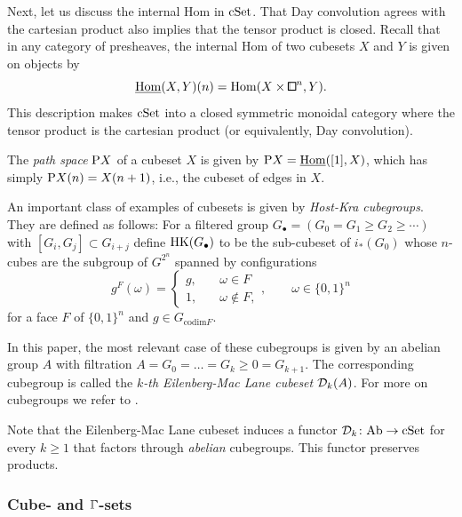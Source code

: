 Next, let us discuss the internal Hom in $\mathrm{cSet}$.
That Day convolution agrees with the cartesian product also implies that the tensor product is closed.
Recall that in any category of presheaves, the internal Hom of two cubesets $X$ and $Y$ is given on objects by
\[
    \ihom(X,Y)(n) = \hom(X\times{\bbox}^n,Y).
\]
This description makes $\mathrm{cSet}$ into a closed symmetric monoidal category where the tensor product
is the cartesian product (or equivalently, Day convolution).

\begin{example}
The \emph{path space} $\mathrm{P} X$ of a cubeset $X$ is given by $\mathrm{P} X = \underline{\operatorname{Hom}}([1],X)$,
which has simply $\mathrm{P} X(n) = X(n+1)$, i.e., the cubeset of edges in $X$.

\end{example}

\begin{example}\label{ex:host_kra_cubegroups}
An important class of examples of cubesets is given by \emph{Host-Kra cubegroups}.
They are defined as follows:
For a filtered group $G_\bullet=(G_0=G_1\ge G_2\ge \cdots)$ with $[G_i,G_j]\subset G_{i+j}$
define $\operatorname{HK}(G_\bullet)$ to be the sub-cubeset of $i_*(G_0)$
whose $n$-cubes are the subgroup of $G^{2^n}$ spanned by configurations
\[
    g^F(\omega)=\begin{cases}
        g,\quad & \omega\in F\\
        1,\quad & \omega \notin F,
    \end{cases},\qquad \omega\in \{0,1\}^n
\]
for a face $F$ of $\{0,1\}^n$ and $g\in G_{\mathrm{codim} F}$.

In this paper, the most relevant case of these cubegroups is given by an abelian group $A$
with filtration $A=G_0=\dots=G_k\ge 0=G_{k+1}$.
The corresponding cubegroup is called the \emph{$k$-th Eilenberg-Mac Lane cubeset $\mathcal{D}_k(A)$}.
For more on cubegroups we refer to \cite{Bihlmaier2026b}.
\end{example}

\begin{remark}\label{rem:EM_preserves_products}
Note that the Eilenberg-Mac Lane cubeset induces a functor $\mathcal{D}_k\colon \mathrm{Ab}\to \mathrm{cSet}$
for every $k\geq 1$ that factors through \emph{abelian} cubegroups.
This functor preserves products.
\end{remark}


\subsubsection{Cube- and \texorpdfstring{$\bbGamma$-}{Gamma}sets}


